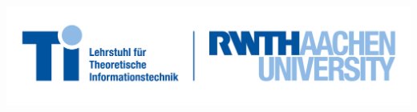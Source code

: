 \begin{titlepage}
\vspace*{-30mm}
\begin{flushright}
\includegraphics{figures/rwth_ti_de_rgb.jpg}
\end{flushright}
\centering
\vspace{1.5\drop} %


\begin{center}
{ \titlefont\renewcommand{\baselinestretch}{1.70}\normalsize
{\emphtitleline \textbf{\titlelineA} } \\[0.7\baselineskip]
{\nonemphtitleline \titlelineB} \\
}

\vspace{1.2\drop} %

\makeatletter
{\Large \titlefont{\@author}}\par %
\makeatother

\end{center}

\vfill %
\vspace*{20mm}

{\large {}}\\[0.5\baselineskip] %
{\large {}}\par %
%
%
\end{titlepage}
%
\cleardoublepage


